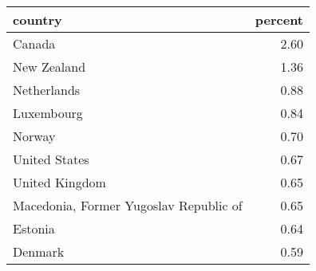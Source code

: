 \begin{table}[ht]
\centering
\begin{tabular}{lr}
  \hline
country & percent \\ 
  \hline
Canada & 2.60 \\ 
  New Zealand & 1.36 \\ 
  Netherlands & 0.88 \\ 
  Luxembourg & 0.84 \\ 
  Norway & 0.70 \\ 
  United States & 0.67 \\ 
  United Kingdom & 0.65 \\ 
  Macedonia, Former Yugoslav Republic of & 0.65 \\ 
  Estonia & 0.64 \\ 
  Denmark & 0.59 \\ 
   \hline
\end{tabular}
\end{table}
